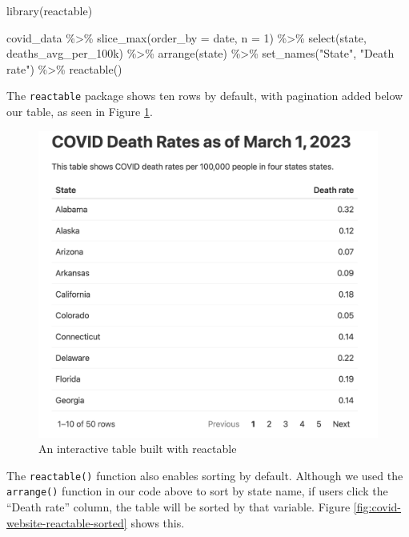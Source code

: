 \documentclass[
]{book}
\newenvironment{Shaded}{\begin{snugshade}}{\end{snugshade}}
\newcommand{\AttributeTok}[1]{\textcolor[rgb]{0.77,0.63,0.00}{#1}}
\newcommand{\DecValTok}[1]{\textcolor[rgb]{0.00,0.00,0.81}{#1}}
\newcommand{\FunctionTok}[1]{\textcolor[rgb]{0.00,0.00,0.00}{#1}}
\newcommand{\NormalTok}[1]{#1}
\newcommand{\SpecialCharTok}[1]{\textcolor[rgb]{0.00,0.00,0.00}{#1}}
\newcommand{\StringTok}[1]{\textcolor[rgb]{0.31,0.60,0.02}{#1}}
\begin{document}
\begin{Shaded}
\begin{Highlighting}[]
\FunctionTok{library}\NormalTok{(reactable)}

\NormalTok{covid\_data }\SpecialCharTok{\%\textgreater{}\%} 
  \FunctionTok{slice\_max}\NormalTok{(}\AttributeTok{order\_by =}\NormalTok{ date,}
            \AttributeTok{n =} \DecValTok{1}\NormalTok{) }\SpecialCharTok{\%\textgreater{}\%} 
  \FunctionTok{select}\NormalTok{(state, deaths\_avg\_per\_100k) }\SpecialCharTok{\%\textgreater{}\%} 
  \FunctionTok{arrange}\NormalTok{(state) }\SpecialCharTok{\%\textgreater{}\%} 
  \FunctionTok{set\_names}\NormalTok{(}\StringTok{"State"}\NormalTok{, }\StringTok{"Death rate"}\NormalTok{) }\SpecialCharTok{\%\textgreater{}\%} 
  \FunctionTok{reactable}\NormalTok{()}
\end{Highlighting}
\end{Shaded}

The \texttt{reactable} package shows ten rows by default, with pagination added below our table, as seen in Figure \ref{fig:covid-website-reactable}.

\begin{figure}
\includegraphics[width=1\linewidth]{assets/covid-website-reactable} \caption{An interactive table built with reactable}\label{fig:covid-website-reactable}
\end{figure}

The \texttt{reactable()} function also enables sorting by default. Although we used the \texttt{arrange()} function in our code above to sort by state name, if users click the ``Death rate'' column, the table will be sorted by that variable. Figure \ref{fig:covid-website-reactable-sorted} shows this.
\end{document}
